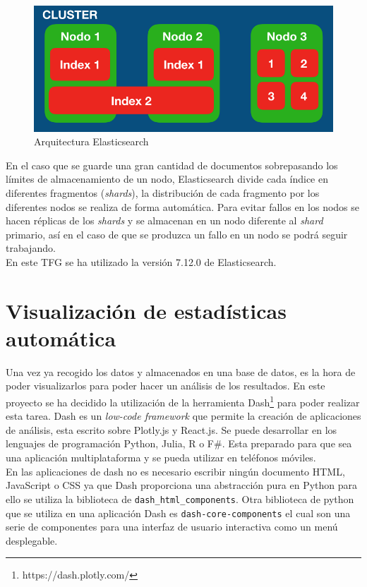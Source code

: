 \begin{figure}[H]
    \centering
    \includegraphics[width=12cm, keepaspectratio]{img/arquitectura_elastic.png}
    \caption{Arquitectura Elasticsearch}
    \label{fig:elastic}
\end{figure}
En el caso que se guarde una gran cantidad de documentos sobrepasando los límites de almacenamiento de un nodo, Elasticsearch divide cada índice en diferentes fragmentos (\textit{shards}), la distribución de cada fragmento por los diferentes nodos se realiza de forma automática. Para evitar fallos en los nodos se hacen réplicas de los \textit{shards} y se almacenan en un nodo diferente al \textit{shard} primario, así en el caso de que se produzca un fallo en un nodo se podrá seguir trabajando.\\

En este TFG se ha utilizado la versión 7.12.0 de Elasticsearch.
\newpage

\section{Visualización de estadísticas automática}

Una vez ya recogido los datos y almacenados en una base de datos, es la hora de poder visualizarlos para poder hacer un análisis de los resultados. En este proyecto se ha decidido la utilización de la herramienta Dash\footnote{https://dash.plotly.com/} para poder realizar esta tarea. Dash es un \textit{low-code framework} que permite la creación de aplicaciones de análisis, esta escrito sobre Plotly.js y React.js. Se puede desarrollar en los lenguajes de programación Python, Julia, R o F#. Esta preparado para que sea una aplicación multiplataforma y se pueda utilizar en teléfonos móviles.\cite{dash}\\

En las aplicaciones de dash no es necesario escribir ningún documento HTML, JavaScript o CSS ya que Dash proporciona una abstracción pura en Python para ello se utiliza la biblioteca de \texttt{dash\_html\_components}. Otra biblioteca de python que se utiliza en una aplicación Dash es \texttt{dash-core-components} el cual son una serie de componentes para una interfaz de usuario interactiva como un menú desplegable.\\

